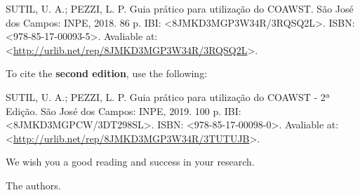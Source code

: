 \bigskip

\noindent SUTIL, U. A.; PEZZI, L. P. Guia prático para utilização do COAWST. São José dos Campos: INPE, 2018. 86 p. IBI: <8JMKD3MGP3W34R/3RQSQ2L>. ISBN: <978-85-17-00093-5>. Avaliable at: <\textcolor{bleu_cite}{\href{http://urlib.net/rep/8JMKD3MGP3W34R/3RQSQ2L}{http://urlib.net/rep/8JMKD3MGP3W34R/3RQSQ2L}}>. 
\bigskip

\noindent To cite the \textbf{second edition}, use the following:
\bigskip

\noindent SUTIL, U. A.; PEZZI, L. P. Guia prático para utilização do COAWST - 2ª Edição. São José dos Campos: INPE, 2019. 100 p. IBI: <8JMKD3MGPCW/3DT298SL>. ISBN: <978-85-17-00098-0>. Avaliable at: <\textcolor{bleu_cite}{\href{http://urlib.net/rep/8JMKD3MGP3W34R/3TUTUJB}{http://urlib.net/rep/8JMKD3MGP3W34R/3TUTUJB}}>. 

\bigskip
\bigskip

\noindent We wish you a good reading and success in your research.
\bigskip

\noindent The authors.
